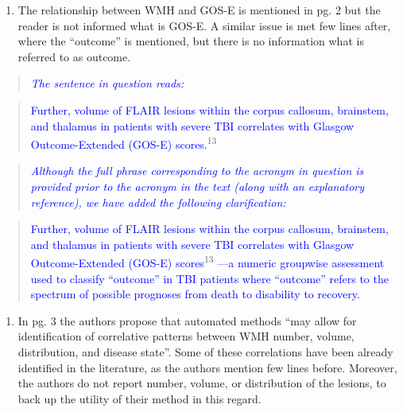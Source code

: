 \documentclass[12pt,]{article}
\providecommand{\tightlist}{%
  \setlength{\itemsep}{0pt}\setlength{\parskip}{0pt}}
\begin{document}
\begin{enumerate}
\def\labelenumi{\arabic{enumi}.}
\setcounter{enumi}{7}
\tightlist
\item
  The relationship between WMH and GOS-E is mentioned in pg. 2 but the
  reader is not informed what is GOS-E. A similar issue is met few lines
  after, where the ``outcome'' is mentioned, but there is no information
  what is referred to as outcome.
\end{enumerate}

\begin{quote}
\emph{\textcolor{blue}{The sentence in question reads:}}
\end{quote}

\begin{quote}
\textcolor{blue}{Further, volume of FLAIR lesions within the corpus
callosum, brainstem, and thalamus in patients with severe TBI correlates
with Glasgow Outcome-Extended (GOS-E) scores.}\textsuperscript{13}
\end{quote}

\begin{quote}
\emph{\textcolor{blue}{Although the full phrase corresponding to the acronym
in question is provided prior to the acronym in the text (along with an
explanatory reference), we have added the following clarification:}}
\end{quote}

\begin{quote}
\textcolor{blue}{Further, volume of FLAIR lesions within the corpus
callosum, brainstem, and thalamus in patients with severe TBI correlates
with Glasgow Outcome-Extended (GOS-E) scores}\textsuperscript{13}
\textcolor{blue}{---a numeric groupwise assessment used to
classify ``outcome'' in TBI patients where ``outcome'' refers to the
spectrum of possible prognoses from death to disability to recovery.}
\end{quote}

\begin{enumerate}
\def\labelenumi{\arabic{enumi}.}
\setcounter{enumi}{8}
\tightlist
\item
  In pg. 3 the authors propose that automated methods ``may allow for
  identification of correlative patterns between WMH number, volume,
  distribution, and disease state''. Some of these correlations have
  been already identified in the literature, as the authors mention few
  lines before. Moreover, the authors do not report number, volume, or
  distribution of the lesions, to back up the utility of their method in
  this regard.
\end{enumerate}
\end{document}
